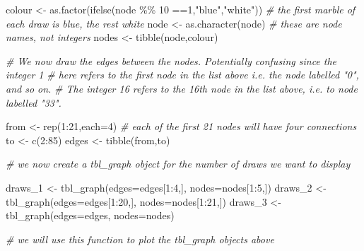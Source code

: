 \documentclass[
]{book}
\newenvironment{Shaded}{\begin{snugshade}}{\end{snugshade}}
\newcommand{\AttributeTok}[1]{\textcolor[rgb]{0.77,0.63,0.00}{#1}}
\newcommand{\CommentTok}[1]{\textcolor[rgb]{0.56,0.35,0.01}{\textit{#1}}}
\newcommand{\DecValTok}[1]{\textcolor[rgb]{0.00,0.00,0.81}{#1}}
\newcommand{\FunctionTok}[1]{\textcolor[rgb]{0.00,0.00,0.00}{#1}}
\newcommand{\NormalTok}[1]{#1}
\newcommand{\OtherTok}[1]{\textcolor[rgb]{0.56,0.35,0.01}{#1}}
\newcommand{\SpecialCharTok}[1]{\textcolor[rgb]{0.00,0.00,0.00}{#1}}
\newcommand{\StringTok}[1]{\textcolor[rgb]{0.31,0.60,0.02}{#1}}
\begin{document}
\begin{Shaded}
\begin{Highlighting}[]
\NormalTok{colour }\OtherTok{\textless{}{-}} \FunctionTok{as.factor}\NormalTok{(}\FunctionTok{ifelse}\NormalTok{(node }\SpecialCharTok{\%\%} \DecValTok{10} \SpecialCharTok{==}\DecValTok{1}\NormalTok{,}\StringTok{"blue"}\NormalTok{,}\StringTok{"white"}\NormalTok{)) }\CommentTok{\# the first marble of each draw is blue, the rest white}
\NormalTok{node }\OtherTok{\textless{}{-}} \FunctionTok{as.character}\NormalTok{(node) }\CommentTok{\# these are node names, not integers}
\NormalTok{nodes }\OtherTok{\textless{}{-}} \FunctionTok{tibble}\NormalTok{(node,colour)}

\CommentTok{\# We now draw the edges between the nodes. Potentially confusing since the integer 1 }
\CommentTok{\# here refers to the first node in the list above i.e. the node labelled "0", and so on. }
\CommentTok{\# The integer 16 refers to the 16th node in the list above, i.e. to node labelled "33".}

\NormalTok{from }\OtherTok{\textless{}{-}} \FunctionTok{rep}\NormalTok{(}\DecValTok{1}\SpecialCharTok{:}\DecValTok{21}\NormalTok{,}\AttributeTok{each=}\DecValTok{4}\NormalTok{) }\CommentTok{\# each of the first 21 nodes will have four connections}
\NormalTok{to }\OtherTok{\textless{}{-}} \FunctionTok{c}\NormalTok{(}\DecValTok{2}\SpecialCharTok{:}\DecValTok{85}\NormalTok{)}
\NormalTok{edges }\OtherTok{\textless{}{-}} \FunctionTok{tibble}\NormalTok{(from,to)}

\CommentTok{\# we now create a tbl\_graph object for the number of draws we want to display }

\NormalTok{draws\_1 }\OtherTok{\textless{}{-}} \FunctionTok{tbl\_graph}\NormalTok{(}\AttributeTok{edges=}\NormalTok{edges[}\DecValTok{1}\SpecialCharTok{:}\DecValTok{4}\NormalTok{,], }\AttributeTok{nodes=}\NormalTok{nodes[}\DecValTok{1}\SpecialCharTok{:}\DecValTok{5}\NormalTok{,])}
\NormalTok{draws\_2 }\OtherTok{\textless{}{-}} \FunctionTok{tbl\_graph}\NormalTok{(}\AttributeTok{edges=}\NormalTok{edges[}\DecValTok{1}\SpecialCharTok{:}\DecValTok{20}\NormalTok{,], }\AttributeTok{nodes=}\NormalTok{nodes[}\DecValTok{1}\SpecialCharTok{:}\DecValTok{21}\NormalTok{,])}
\NormalTok{draws\_3 }\OtherTok{\textless{}{-}} \FunctionTok{tbl\_graph}\NormalTok{(}\AttributeTok{edges=}\NormalTok{edges, }\AttributeTok{nodes=}\NormalTok{nodes)}

\CommentTok{\# we will use this function to plot the tbl\_graph objects above}


\end{Highlighting}
\end{Shaded}
\end{document}
